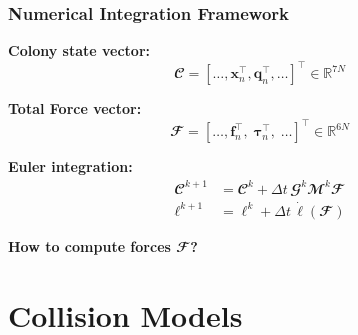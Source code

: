 \documentclass[10pt,t]{beamer}
\begin{document}
\begin{frame}
    \frametitle{Numerical Integration Framework}

    \textbf{Colony state vector:}
    \begin{equation*}
        \mathbfcal{C} = [\dots, \mathbf{x}_n^\top, \mathbf{q}_n^\top, \dots]^\top \in \mathbb{R}^{7N}
    \end{equation*}

    \textbf{Total Force vector:}
    \begin{equation*}
        \mathbfcal{F}  = [\dots, \mathbf{f}_n^\top,\;\boldsymbol{\tau}_n^\top,\;\dots]^\top \in \mathbb{R}^{6N}
    \end{equation*}

    \vspace{0.8cm}

    \textbf{Euler integration:}
    \begin{equation*}
        \begin{aligned}
            \mathbfcal{C}^{k+1}     & = \mathbfcal{C}^k + \Delta t \, \mathbfcal{G}^k \mathbfcal{M}^k \mathbfcal{F} \\
            \boldsymbol{\ell}^{k+1} & = \boldsymbol{\ell}^k + \Delta t \, \dot{\boldsymbol{\ell}}(\mathbfcal{F})
        \end{aligned}
    \end{equation*}

    \vspace{0.1cm}

    \begin{center}
        \colorbox{yellow!30}{
            \textbf{How to compute forces $\mathbfcal{F}$?}
        }
    \end{center}

\end{frame}


\section{Collision Models}
\end{document}
